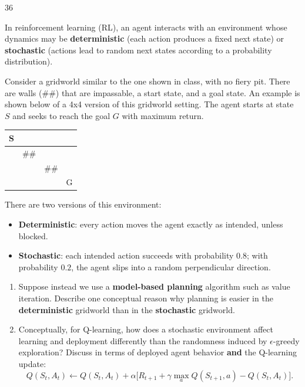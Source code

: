 \documentclass[11pt]{article}
\begin{document}
\begin{problem}{3}{6}

In reinforcement learning (RL), an agent interacts with an environment whose dynamics may be 
\textbf{deterministic} (each action produces a fixed next state) or 
\textbf{stochastic} (actions lead to random next states according to a probability distribution).

Consider a gridworld similar to the one shown in class, with no fiery pit. There are walls (\#\#) that are impassable, a start state, and a goal state. An example is shown below of a 4x4 version of this gridworld setting. The agent starts at state $S$ and seeks to reach the goal $G$ with maximum return.

\begin{center}
\begin{tabular}{|c|c|c|c|}
\hline
S &  &  &  \\ \hline
  & \#\# &  &  \\ \hline
  &  & \#\# &  \\ \hline
  &  &  & G \\ \hline
\end{tabular}
\end{center}

There are two versions of this environment:

\begin{itemize}
    \item \textbf{Deterministic}: every action moves the agent exactly as intended, unless blocked.
    \item \textbf{Stochastic}: each intended action succeeds with probability $0.8$; with probability $0.2$, the agent slips into a random perpendicular direction.
\end{itemize}

\begin{enumerate}[label=(\alph*)]

\item Suppose instead we use a \textbf{model-based planning} algorithm such as value iteration.  
Describe one conceptual reason why planning is easier in the \textbf{deterministic} gridworld than in the \textbf{stochastic} gridworld. 

\item Conceptually, for Q-learning, how does a stochastic environment affect learning and deployment differently than the randomness induced by $\epsilon$-greedy exploration? Discuss in terms of deployed agent behavior \textbf{and} the Q-learning update: \[
Q(S_t, A_t) \leftarrow Q(S_t, A_t) + \alpha \Big[ R_{t+1} + \gamma \max_{a} Q(S_{t+1}, a) - Q(S_t, A_t) \Big].
\]


\end{enumerate}



\end{problem}
\end{document}
